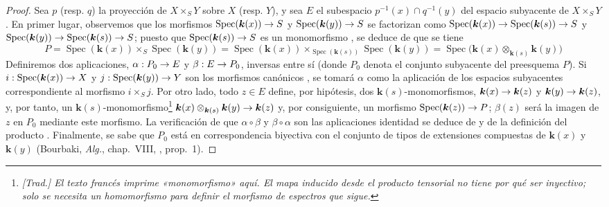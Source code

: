 \documentclass[oneside]{amsart}
\theoremstyle{ega-env-style}
\theoremstyle{ega-thm-env-style}
\theoremstyle{ega-defn-env-style}
\renewcommand{\to}{\mathchoice{\longrightarrow}{\rightarrow}{\rightarrow}{\rightarrow}}
\let\EGAOriginalLabel\label
\renewcommand{\label}[1]{\phantomsection\EGAOriginalLabel{#1}}
\begin{document}
\begin{proof}
Sea $p$ (resp. $q$) la proyección de $X\times_S Y$ sobre $X$ (resp. $Y$), y sea $E$ el subespacio $p^{-1}(x)\cap q^{-1}(y)$ del espacio subyacente de $X\times_S Y$.
En primer lugar, observemos que los morfismos $\operatorname{Spec}(\boldsymbol{k}(x))\to S$ y $\operatorname{Spec}(\boldsymbol{k}(y))\to S$ se factorizan como $\operatorname{Spec}(\boldsymbol{k}(x))\to\operatorname{Spec}(\boldsymbol{k}(s))\to S$ y $\operatorname{Spec}(\boldsymbol{k}(y))\to\operatorname{Spec}(\boldsymbol{k}(s))\to S$; puesto que $\operatorname{Spec}(\boldsymbol{k}(s))\to S$ es un monomorfismo , se deduce de  que se tiene
\label{I.3.4.9.tensor-product-fibre-fr}
\[
  P=\operatorname{Spec}(\boldsymbol{k}(x))\times_S\operatorname{Spec}(\boldsymbol{k}(y))
  =\operatorname{Spec}(\boldsymbol{k}(x))\times_{\operatorname{Spec}(\boldsymbol{k}(s))}
   \operatorname{Spec}(\boldsymbol{k}(y))
  =\operatorname{Spec}\bigl(\boldsymbol{k}(x)\otimes_{\boldsymbol{k}(s)}\boldsymbol{k}(y)\bigr)
\]
Definiremos dos aplicaciones, $\alpha:P_0\to E$ y $\beta:E\to P_0$, inversas entre sí (donde $P_0$ denota el conjunto subyacente del preesquema $P$).
Si $i:\operatorname{Spec}(\boldsymbol{k}(x))\to X$ y $j:\operatorname{Spec}(\boldsymbol{k}(y))\to Y$ son los morfismos canónicos , se tomará $\alpha$ como la aplicación de los espacios subyacentes correspondiente al morfismo $i\times_S j$.
Por otro lado, todo $z\in E$ define, por hipótesis, dos $\boldsymbol{k}(s)$-monomorfismos, $\boldsymbol{k}(x)\to \boldsymbol{k}(z)$ y $\boldsymbol{k}(y)\to \boldsymbol{k}(z)$, y, por tanto, un $\boldsymbol{k}(s)$-monomorfismo\footnote{\emph{[Trad.] El texto francés imprime «monomorfismo» aquí. El mapa inducido desde el producto tensorial no tiene por qué ser inyectivo; solo se necesita un homomorfismo para definir el morfismo de espectros que sigue.}} $\boldsymbol{k}(x)\otimes_{\boldsymbol{k}(s)}\boldsymbol{k}(y)\to \boldsymbol{k}(z)$ y, por consiguiente, un morfismo $\operatorname{Spec}(\boldsymbol{k}(z))\to P$; $\beta(z)$ será la imagen de $z$ en $P_0$ mediante este morfismo.
La verificación de que $\alpha\circ\beta$ y $\beta\circ\alpha$ son las aplicaciones identidad se deduce de  y de la definición del producto .
Finalmente, se sabe que $P_0$ está en correspondencia biyectiva con el conjunto de tipos de extensiones compuestas de $\boldsymbol{k}(x)$ y $\boldsymbol{k}(y)$ (Bourbaki, \emph{Alg.}, chap.~VIII, , prop.~1).
\end{proof}
\end{document}
